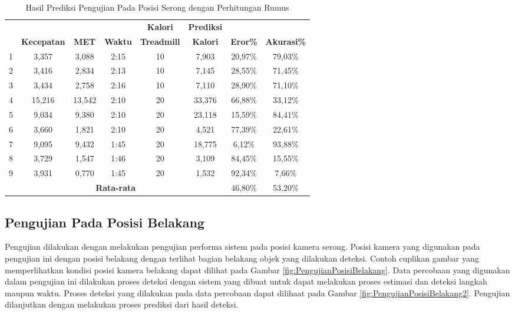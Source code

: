\begin{longtable}{|c|c|c|c|c|c|c|c|}
  \caption{Hasil Prediksi Pengujian Pada Posisi Serong dengan Perhitungan Rumus}
  \label{tb:PengujianPosisiSerongAnalisaPrediksiPerhitungan}                                   \\
  \hline
  \rowcolor[HTML]{C0C0C0}
  & & & & \textbf{Kalori} & \textbf{Prediksi} & & \\
  \rowcolor[HTML]{C0C0C0}
  \multirow{-2}{*}{\textbf{Percobaan}} & \multirow{-2}{*}{\textbf{Kecepatan}} & \multirow{-2}{*}{\textbf{MET}} & \multirow{-2}{*}{\textbf{Waktu}} & \textbf{Treadmill} & \textbf{Kalori} & \multirow{-2}{*}{\textbf{Eror\%}} & \multirow{-2}{*}{\textbf{Akurasi\%}} \\
  \hline
  1   & 3,357   & 3,088    & 2:15    & 10   & 7,903     & 20,97\%     & 79,03\%   \\
  \hline
  2   & 3,416   & 2,834    & 2:13    & 10   & 7,145     & 28,55\%     & 71,45\%   \\
  \hline
  3   & 3,434   & 2,758    & 2:16    & 10   & 7,110     & 28,90\%     & 71,10\%   \\
  \hline
  4   & 15,216  & 13,542   & 2:10    & 20   & 33,376    & 66,88\%     & 33,12\%   \\
  \hline
  5   & 9,034   & 9,380    & 2:10    & 20   & 23,118    & 15,59\%     & 84,41\%   \\
  \hline
  6   & 3,660   & 1,821    & 2:10    & 20   & 4,521     & 77,39\%     & 22,61\%   \\
  \hline
  7   & 9,095   & 9,432    & 1:45    & 20    & 18,775   & 6,12\%      & 93,88\%   \\
  \hline
  8   & 3,729   & 1,547    & 1:46    & 20    & 3,109    & 84,45\%     & 15,55\%   \\
  \hline
  9   & 3,931   & 0,770    & 1:45    & 20    & 1,532    & 92,34\%     & 7,66\%   \\
  \hline

  \multicolumn{6}{|c|}{\textbf{Rata-rata}} & 46,80\% & 53,20\%  \\
  \hline
\end{longtable}

\subsection{Pengujian Pada Posisi Belakang}
\label{subsec:PengujianPosisiBelakang}

Pengujian dilakukan dengan melakukan pengujian performa sistem pada posisi kamera serong. Posisi kamera yang digunakan pada pengujian ini dengan posisi belakang dengan terlihat bagian belakang objek yang dilakukan deteksi. Contoh cuplikan gambar yang memperlihatkan kondisi posisi kamera belakang dapat dilihat pada Gambar \ref{fig:PengujianPosisiBelakang}. Data percobaan yang digunakan dalam pengujian ini dilakukan proses deteksi dengan sistem yang dibuat untuk dapat melakukan proses estimasi dan deteksi langkah maupun waktu. Proses deteksi yang dilakukan pada data percobaan dapat dilihaat pada Gambar \ref{fig:PengujianPosisiBelakang2}. Pengujian dilanjutkan dengan melakukan proses prediksi dari hasil deteksi.


